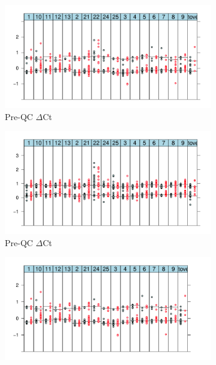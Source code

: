 \hspace{-2cm}
\begin{figure}[!h]
    \begin{subfigure}[b]{.4\textwidth}
    \includegraphics[scale=.5] {figures/KIR3DS1-preQC.pdf}
    \caption{ \label{Figure-S1:a}
      Pre-QC  $\Delta$Ct}
    \end{subfigure}
    \begin{subfigure}[b]{.4\textwidth}
    \includegraphics[scale=.5] {figures/KIR3DL1-preQC.pdf}
    \caption{ \label{Figure-S1:b}
      Pre-QC  $\Delta$Ct}
    \end{subfigure}
    \begin{subfigure}[b]{.4\textwidth}
    \includegraphics[scale=.5] {figures/KIR3DS1-postQC.pdf}

\end{subfigure}
\end{figure}
